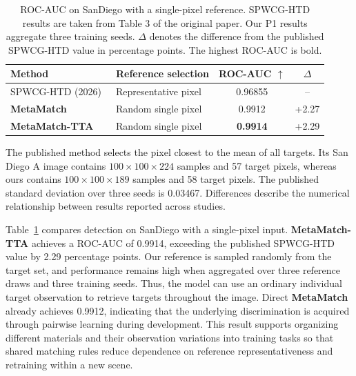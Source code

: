 \documentclass[a4paper,11pt]{article}
\newcommand{\method}{\textbf{MetaMatch-TTA}}
\newcommand{\matcher}{\textbf{MetaMatch}}
\begin{document}
\begin{table}[H]\centering\small\setlength{\tabcolsep}{7pt}
\caption{ROC-AUC on SanDiego with a single-pixel reference. SPWCG-HTD results are taken from Table 3 of the original paper. Our P1 results aggregate three training seeds. $\Delta$ denotes the difference from the published SPWCG-HTD value in percentage points. The highest ROC-AUC is bold.}\label{tab:selected_single}
\begin{tabular}{llcc}\toprule
Method & Reference selection & ROC-AUC $\uparrow$ & $\Delta$ \\ \midrule
SPWCG-HTD (2026)~\cite{spwcg2026} & Representative pixel & 0.96855 & -- \\
\matcher{} & Random single pixel & 0.9912 & +2.27 \\
\method{} & Random single pixel & \textbf{0.9914} & +2.29 \\
\bottomrule\end{tabular}
\par\vspace{3pt}\begin{minipage}{0.98\linewidth}\footnotesize
The published method selects the pixel closest to the mean of all targets. Its San Diego A image contains $100\times100\times224$ samples and 57 target pixels, whereas ours contains $100\times100\times189$ samples and 58 target pixels. The published standard deviation over three seeds is 0.03467. Differences describe the numerical relationship between results reported across studies.
\end{minipage}\end{table}

Table~\ref{tab:selected_single} compares detection on SanDiego with a single-pixel input. \method{} achieves a ROC-AUC of 0.9914, exceeding the published SPWCG-HTD value by 2.29 percentage points. Our reference is sampled randomly from the target set, and performance remains high when aggregated over three reference draws and three training seeds. Thus, the model can use an ordinary individual target observation to retrieve targets throughout the image. Direct \matcher{} already achieves 0.9912, indicating that the underlying discrimination is acquired through pairwise learning during development. This result supports organizing different materials and their observation variations into training tasks so that shared matching rules reduce dependence on reference representativeness and retraining within a new scene.
\end{document}
